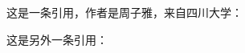 \documentclass{ctexart}
\begin{document}
    这是一条引用，作者是周子雅，来自四川大学： \cite{__2019-2}

    这是另外一条引用： \cite{__2019-1}

    \nocite{*}

    
\end{document}
